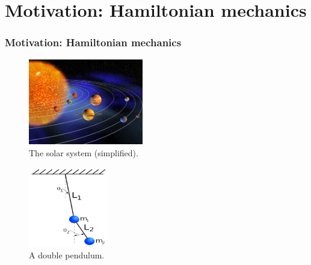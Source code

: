 \section{Motivation: Hamiltonian mechanics}



\begin{frame}
  \frametitle{Motivation: Hamiltonian mechanics}
  \pause
  \begin{minipage}{0.45\textwidth}
    \begin{figure}
      \includegraphics[width=5cm]{images/solar_system.jpg}\\
      The solar system (simplified).
    \end{figure}
  \end{minipage}
  \hspace{1cm}
  \begin{minipage}{0.4\textwidth}
    \begin{figure}
      \includegraphics[height=3.5cm]{images/double_pendulum.jpg}\\
      A double pendulum.
    \end{figure}
  \end{minipage}
\end{frame}

